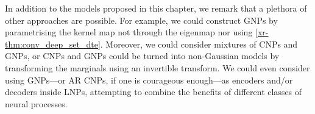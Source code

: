 \documentclass[12pt]{report}
\newcommand{\xrprefix}[1]{xr-#1}
\begin{document}
In addition to the models proposed in this chapter, we remark that a plethora of other approaches are possible.
For example, we could construct GNPs by parametrising the kernel map not through the eigenmap nor using \cref{\xrprefix{thm:conv_deep_set_dte}}.
Moreover, we could consider mixtures of CNPs and GNPs, or CNPs and GNPs could be turned into non-Gaussian models by transforming the marginals using an invertible transform.
We could even consider using GNPs---or AR CNPs, if one is courageous enough---as encoders and/or decoders inside LNPs,
attempting to combine the benefits of different classes of neural processes.


\end{document}
